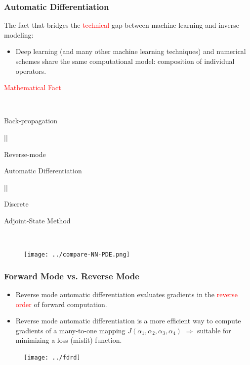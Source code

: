 \documentclass[usenames,dvipsnames]{beamer}
\begin{document}
\begin{frame}
	\frametitle{Automatic Differentiation}
The fact that bridges the \textcolor{red}{technical} gap between machine learning and inverse modeling:
	\begin{itemize}
		\item Deep learning (and many other machine learning techniques) and numerical schemes share the same computational model: composition of individual operators. 
	\end{itemize}
	

\begin{minipage}[b]{0.4\textwidth}




\begin{center}
\textcolor{red}{Mathematical Fact}

\

	Back-propagation 

$||$

Reverse-mode

 Automatic Differentiation 

$||$
 
 Discrete 
 
 Adjoint-State Method
\end{center}
\end{minipage}~
\begin{minipage}[b]{0.6\textwidth}
\begin{figure}[hbt]
\centering
  \texttt{[image: ../compare-NN-PDE.png]}
\end{figure}
\end{minipage}

\end{frame}




\begin{frame}
	\frametitle{Forward Mode vs. Reverse Mode}
	
	\begin{itemize}
		\item Reverse mode automatic differentiation evaluates gradients in the \textcolor{red}{reverse order} of forward computation. 
		\item Reverse mode automatic differentiation is a more efficient way to compute gradients of a many-to-one mapping $J(\alpha_1, \alpha_2, \alpha_3,\alpha_4)$ $\Rightarrow$ suitable for minimizing a loss (misfit) function. 
	\end{itemize}
	
	\begin{figure}[hbt]
		\texttt{[image: ../fdrd]}
	\end{figure}
	
	
	
\end{frame}
\end{document}
